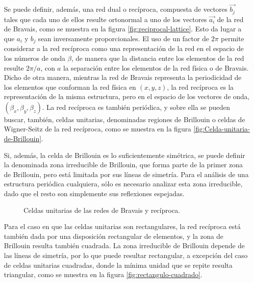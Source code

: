 Se puede definir, además, una red dual o recíproca, compuesta de vectores $\vec{b_j}$ tales que cada uno de ellos resulte ortonormal a uno de los vectores $\vec{a_i}$ de la red de Bravais, como se muestra en la figura \ref{fig:reciprocal-lattice}. Esto da lugar a que $a_i$ y $b_j$ sean inversamente proporcionales. El uso de un factor de $2\pi$ permite considerar a la red recíproca como una representación de la red en el espacio de los números de onda $\beta$, de manera que la distancia entre los elementos de la red resulte $2\pi/a$, con $a$ la separación entre los elementos de la red física o de Bravais. Dicho de otra manera, mientras la red de Bravais representa la periodicidad de los elementos que conforman la red física en $(x,y,z)$, la red recíproca es la representación de la misma estructura, pero en el espacio de los vectores de onda, $(\beta_x, \beta_y, \beta_z)$. La red recíproca es también periódica, y sobre ella se pueden buscar, también, celdas unitarias, denominadas regiones de Brillouin o celdas de Wigner-Seitz de la red recíproca, como se muestra en la figura \ref{fig:Celda-unitaria-de-Brillouin}.

Si, además, la celda de Brillouin es lo suficientemente simétrica, se puede definir la denominada zona irreducible de Brillouin, que forma parte de la primer zona de Brillouin, pero está limitada por sus líneas de simetría. Para el análisis de una estructura periódica cualquiera, sólo es necesario analizar esta zona irreducible, dado que el resto son simplemente sus reflexiones espejadas.

\begin{figure}[H]
	\centering 
	\hspace{0pt}
	\caption{Celdas unitarias de las redes de Bravais y recíproca.}
	\label{fig:celdas-unitarias}
\end{figure}

Para el caso en que las celdas unitarias son rectangulares, la red recíproca está también dada por una disposición rectangular de elementos, y la zona de Brillouin resulta también cuadrada. La zona irreducible de Brillouin depende de las líneas de simetría, por lo que puede resultar rectangular, a excepción del caso de celdas unitarias cuadradas, donde la mínima unidad que se repite resulta triangular, como se muestra en la figura \ref{fig:rectangulo-cuadrado}.

